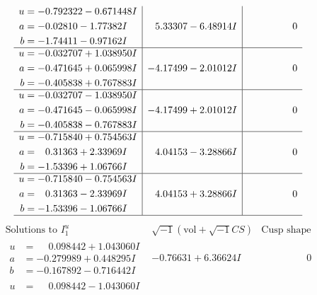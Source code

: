 \documentclass[1p]{elsarticle_modified}
\theoremstyle{definition}
\newcommand{\I}{\sqrt{-1}}
\begin{document}
$$\begin{array}{c|c|c}
\begin{aligned}
u &= -0.792322 - 0.671448 I \\
a &= -0.02810 - 1.77382 I \\
b &= -1.74411 - 0.97162 I\end{aligned}
 & \phantom{-}5.33307 - 6.48914 I & \phantom{-0.000000 } 0 \\ \hline\begin{aligned}
u &= -0.032707 + 1.038950 I \\
a &= -0.471645 + 0.065998 I \\
b &= -0.405838 + 0.767883 I\end{aligned}
 & -4.17499 - 2.01012 I & \phantom{-0.000000 } 0 \\ \hline\begin{aligned}
u &= -0.032707 - 1.038950 I \\
a &= -0.471645 - 0.065998 I \\
b &= -0.405838 - 0.767883 I\end{aligned}
 & -4.17499 + 2.01012 I & \phantom{-0.000000 } 0 \\ \hline\begin{aligned}
u &= -0.715840 + 0.754563 I \\
a &= \phantom{-}0.31363 + 2.33969 I \\
b &= -1.53396 + 1.06766 I\end{aligned}
 & \phantom{-}4.04153 - 3.28866 I & \phantom{-0.000000 } 0 \\ \hline\begin{aligned}
u &= -0.715840 - 0.754563 I \\
a &= \phantom{-}0.31363 - 2.33969 I \\
b &= -1.53396 - 1.06766 I\end{aligned}
 & \phantom{-}4.04153 + 3.28866 I & \phantom{-0.000000 } 0\\
 \hline 
 \end{array}$$\newpage$$\begin{array}{c|c|c}  
\text{Solutions to }I^u_{1}& \I (\text{vol} + \sqrt{-1}CS) & \text{Cusp shape}\\
 \hline 
\begin{aligned}
u &= \phantom{-}0.098442 + 1.043060 I \\
a &= -0.279989 + 0.448295 I \\
b &= -0.167892 - 0.716442 I\end{aligned}
 & -0.76631 + 6.36624 I & \phantom{-0.000000 } 0 \\ \hline\begin{aligned}
u &= \phantom{-}0.098442 - 1.043060 I \\

\end{aligned}
\end{array}$$
\end{document}
